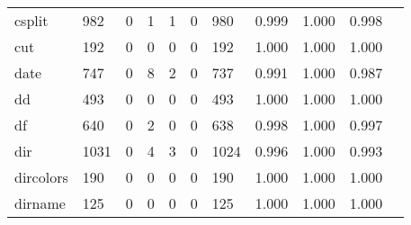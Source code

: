 \begin{longtable}{lp{1.10cm}p{1.10cm}p{1.10cm}p{1.10cm}p{1.10cm}p{1.10cm}p{1.10cm}p{1.10cm}p{1.10cm}p{1.10cm}}
csplit    &                    982 &                                  0 &                                 1 &                                1 &                                 0 &                             980 &                             0.999 &                                 1.000 &                               0.998 \\
cut       &                    192 &                                  0 &                                 0 &                                0 &                                 0 &                             192 &                             1.000 &                                 1.000 &                               1.000 \\
date      &                    747 &                                  0 &                                 8 &                                2 &                                 0 &                             737 &                             0.991 &                                 1.000 &                               0.987 \\
dd        &                    493 &                                  0 &                                 0 &                                0 &                                 0 &                             493 &                             1.000 &                                 1.000 &                               1.000 \\
df        &                    640 &                                  0 &                                 2 &                                0 &                                 0 &                             638 &                             0.998 &                                 1.000 &                               0.997 \\
dir       &                   1031 &                                  0 &                                 4 &                                3 &                                 0 &                            1024 &                             0.996 &                                 1.000 &                               0.993 \\
dircolors &                    190 &                                  0 &                                 0 &                                0 &                                 0 &                             190 &                             1.000 &                                 1.000 &                               1.000 \\
dirname   &                    125 &                                  0 &                                 0 &                                0 &                                 0 &                             125 &                             1.000 &                                 1.000 &                               1.000 \\

\end{longtable}
